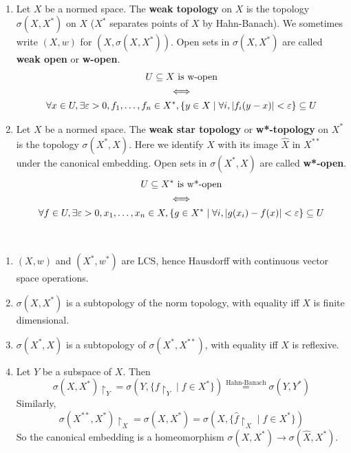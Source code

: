 \documentclass{article}
\begin{document}
\begin{egs*}~
  \begin{enumerate}
    \item Let $X$  be a normed space. The {\bf weak topology} on $X$ is the topology $\sigma(X, X^*)$ on $X$ ($X^*$ separates points of $X$ by Hahn-Banach). We sometimes write $(X, w)$ for $(X, \sigma(X, X^*))$. Open sets in $\sigma(X, X^*)$ are called {\bf weak open} or {\bf w-open}.
    \begin{equation*}
      \begin{gathered}
        U \subseteq X \text{ is w-open} \\
        \iff \\
        \forall x \in U, \exists \varepsilon > 0, f_1, \dots, f_n \in X^*, \{y \in X \mid \forall i, \left\lvert f_i(y - x)\right\rvert < \varepsilon\} \subseteq U
      \end{gathered}
    \end{equation*}
    \item Let $X$ be a normed space. The {\bf weak star topology} or {\bf w*-topology} on $X^*$ is the topology $\sigma(X^*, X)$. Here we identify $X$ with its image $\hat X$ in $X^{**}$ under the canonical embedding. Open sets in $\sigma(X^*, X)$ are called {\bf w*-open}.
    \begin{equation*}
      \begin{gathered}
        U \subseteq X^* \text{ is w*-open} \\
        \iff \\
        \forall f \in U, \exists \varepsilon > 0, x_1, \dots, x_n \in X, \{g \in X^* \mid \forall i, \left\lvert g(x_i) - f(x)\right\rvert < \varepsilon\} \subseteq U
    \end{gathered}
  \end{equation*}
  \end{enumerate}
\end{egs*}

\begin{properties}~
  \begin{enumerate}
    \item $(X, w)$ and $(X^*, w^*)$ are LCS, hence Hausdorff with continuous vector space operations.
    \item $\sigma(X, X^*)$ is a subtopology of the norm topology, with equality iff $X$ is finite dimensional.
    \item $\sigma(X^*, X)$ is a subtopology of $\sigma(X^*, X^{**})$, with equality iff $X$ is reflexive.
    \item Let $Y$ be a subspace of $X$. Then
    $$\sigma(X, X^*)\restriction_Y = \sigma(Y, \{f\restriction_Y \mid f \in X^*\}) \overset{\text{Hahn-Banach}} = \sigma(Y, Y^*)$$
    Similarly,
    $$\sigma(X^{**}, X^*)\restriction_X = \sigma(X, X^*) = \sigma(X, \{\hat f\restriction_X \mid f \in X^*\})$$
    So the canonical embedding is a homeomorphism $\sigma(X, X^*) \to \sigma(\hat X, X^*)$.
  \end{enumerate}
\end{properties}
\end{document}
